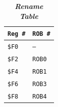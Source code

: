 \begin{enumerate}
    \begin{table}[!htp]
        \centering
        \begin{tabular}{@{} l l @{}}
            \toprule
            \texttt{Reg \#}  & \texttt{ROB \#} \\
            \midrule
            \texttt{\$F0}    & \texttt{--} \\ [.3em]
            \texttt{\$F2}    & \texttt{ROB0} \\ [.3em]
            \texttt{\$F4}    & \texttt{ROB1} \\ [.3em]
            \texttt{\$F6}    & \texttt{ROB3} \\ [.3em]
            \texttt{\$F8}    & \texttt{ROB4} \\
            \bottomrule
        \end{tabular}
        \caption*{\emph{\textbf{Rename Table}}}
    \end{table}



\end{enumerate}
